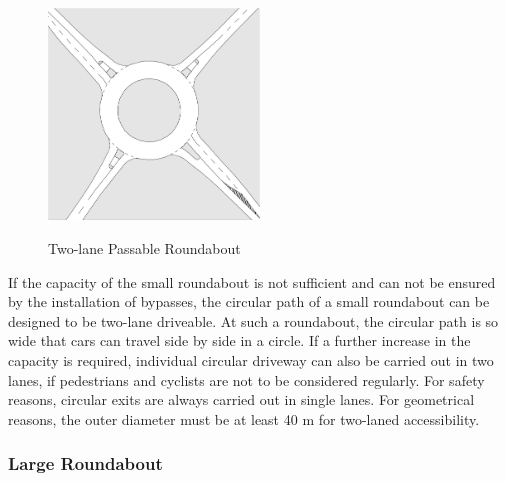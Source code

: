 \begin{figure}[!ht]
\caption{Two-lane Passable Roundabout \cite{man06}}
\includegraphics[width=0.5\textwidth]{bilder/twolaned_roundabout.png} %
\label{roundabout_twolaned}
\end{figure}

%
If the capacity of the small roundabout is not sufficient and can not be ensured by the installation of bypasses,
the circular path of a small roundabout can be designed to be two-lane driveable.
At such a roundabout, the circular path is so wide that cars can travel side by side in a circle.
If a further increase in the capacity is required, individual circular driveway can also be carried out in two lanes, if pedestrians and cyclists are not to be considered regularly.
For safety reasons, circular exits are always carried out in single lanes.
For geometrical reasons, the outer diameter must be at least 40 m for two-laned accessibility.


\subsubsection{Large Roundabout}


